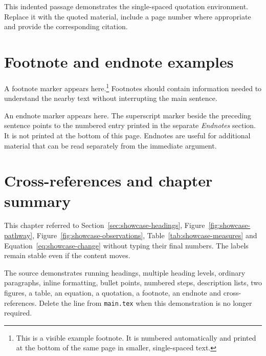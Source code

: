 \begin{brightonquotation}
This indented passage demonstrates the single-spaced quotation environment.
Replace it with the quoted material, include a page number where appropriate
and provide the corresponding citation.
\end{brightonquotation}

\section{Footnote and endnote examples}

A footnote marker appears here.\footnote{This is a visible example footnote.
It is numbered automatically and printed at the bottom of the same page in
smaller, single-spaced text.} Footnotes should contain information needed to
understand the nearby text without interrupting the main sentence.

An endnote marker appears here.
The superscript marker beside the preceding sentence points to the numbered
entry printed in the separate \emph{Endnotes} section. It is not printed at
the bottom of this page. Endnotes are useful for additional material that can
be read separately from the immediate argument.

\section{Cross-references and chapter summary}

This chapter referred to Section~\ref{sec:showcase-headings},
Figure~\ref{fig:showcase-pathway}, Figure~\ref{fig:showcase-observations},
Table~\ref{tab:showcase-measures} and Equation~\ref{eq:showcase-change} without
typing their final numbers. The labels remain stable even if the content moves.

The source demonstrates running headings, multiple heading levels, ordinary
paragraphs, inline formatting, bullet points, numbered steps, description
lists, two figures, a table, an equation, a quotation, a footnote, an endnote
and cross-references. Delete the line
\verb|| from \texttt{main.tex} when
this demonstration is no longer required.
